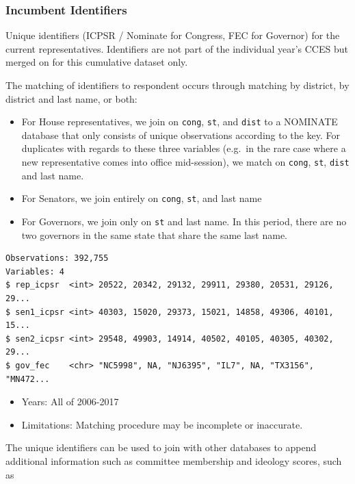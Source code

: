 \documentclass[10pt,article,oneside]{memoir}
\theoremstyle{definition}
\begin{document}
\subsubsection{Incumbent Identifiers}\label{incumbent-identifiers}

Unique identifiers (ICPSR / Nominate for Congress, FEC for Governor) for
the current representatives. Identifiers are not part of the individual
year's CCES but merged on for this cumulative dataset only.

The matching of identifiers to respondent occurs through matching by
district, by district and last name, or both:

\begin{itemize}
\tightlist
\item
  For House representatives, we join on \texttt{cong}, \texttt{st}, and
  \texttt{dist} to a NOMINATE database that only consists of unique
  observations according to the key. For duplicates with regards to
  these three variables (e.g.~in the rare case where a new
  representative comes into office mid-session), we match on
  \texttt{cong}, \texttt{st}, \texttt{dist} and last name.
\item
  For Senators, we join entirely on \texttt{cong}, \texttt{st}, and last
  name
\item
  For Governors, we join only on \texttt{st} and last name. In this
  period, there are no two governors in the same state that share the
  same last name.
\end{itemize}

\begin{verbatim}
Observations: 392,755
Variables: 4
$ rep_icpsr  <int> 20522, 20342, 29132, 29911, 29380, 20531, 29126, 29...
$ sen1_icpsr <int> 40303, 15020, 29373, 15021, 14858, 49306, 40101, 15...
$ sen2_icpsr <int> 29548, 49903, 14914, 40502, 40105, 40305, 40302, 29...
$ gov_fec    <chr> "NC5998", NA, "NJ6395", "IL7", NA, "TX3156", "MN472...
\end{verbatim}

\begin{itemize}
\tightlist
\item
  Years: All of 2006-2017
\item
  Limitations: Matching procedure may be incomplete or inaccurate.
\end{itemize}

The unique identifiers can be used to join with other databases to
append additional information such as committee membership and ideology
scores, such as
\end{document}

